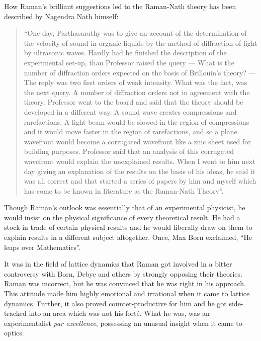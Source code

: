 How Raman's brilliant suggestions led to the Raman-Nath
theory has been described by Nagendra Nath himself:
\begin{quote}
{\fontsize{10}{12}\selectfont
``One day, Parthasarathy was to give an account of the
determination of the velocity of sound in organic liquids by the
method of diffraction of light by ultrasonic waves. Hardly had
he finished the description of the experimental set-up, than
Professor raised the query --- What is the number of diffraction
orders expected on the basis of Brillouin's theory? --- The reply
was two first orders of weak intensity. What was the fact, was
the next query. A number of diffraction orders not in agreement
with the theory. Professor went to the board and said that the
theory should be developed in a different way. A sound wave
creates compressions and rarefactions. A light beam would be
slowed in the region of compressions and it would move faster
in the region of rarefactions, and so a plane wavefront would
become a corrugated wavefront like a zinc sheet used for building
purposes. Professor said that an analysis of this corrugated
wavefront would explain the unexplained results. When I went
to him next day giving an explanation of the results on the basis
of his ideas, he said it was all correct and that started a series
of papers by him and myself which has come to be known in
literature as the Raman-Nath Theory''.}\relax
\end{quote}

\newpage

Though Raman's outlook was essentially that of an
experimental physicist, he would insist on the physical significance
of every theoretical result. He had a stock in trade of certain
physical results and he would liberally draw on them to explain
results in a different subject altogether. Once, Max Born
exclaimed, ``He leaps over Mathematics''.

It was in the field of lattice dynamics that Raman got
involved in a bitter controversy with Born, Debye and others by
strongly opposing their theories. Raman was incorrect, but he
was convinced that he was right in his approach. This attitude
made him highly emotional and irrational when it came to lattice
dynamics. Further, it also proved counter-productive for him and
he got side-tracked into an area which was not his fort\'e. What
he was, was an experimentalist {\em par excellence}, possessing an
unusual insight when it came to optics.

